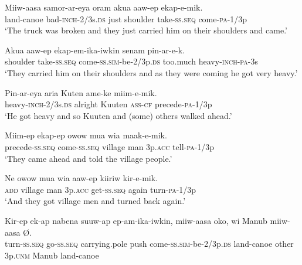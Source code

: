 \ea\label{ex:a:x41}
\gll  Miiw-aasa  samor-ar-eya  oram  akua  aaw-ep  ekap-e-mik. \\
land-canoe  bad-\textsc{inch}-2/3s.\textsc{ds}  just  shoulder  take-\textsc{ss.seq}  come-\textsc{pa}-1/3p \\
\glt ‘The truck was broken and they just carried him on their shoulders and came.’ \\
\z


\ea\label{ex:a:x42}
\gll  Akua  aaw-ep  ekap-em-ika-iwkin  senam             pin-ar-e-k. \\
shoulder  take-\textsc{ss.seq}  come-\textsc{ss}.\textsc{sim}-be-2/3p.\textsc{ds}  too.much  heavy-\textsc{inch}-\textsc{pa}-3s \\


\glt ‘They carried him on their shoulders and as they were coming he got very heavy.’ \\
\z


\ea\label{ex:a:x43}
\gll  Pin-ar-eya  aria  Kuten  ame-ke  miim-e-mik. \\
heavy-\textsc{inch}-2/3s.\textsc{ds}  alright  Kuuten  \textsc{ass}-\textsc{cf}  precede-\textsc{pa}-1/3p \\
\glt ‘He got heavy and so Kuuten and (some) others walked ahead.’ \\
\z


\ea\label{ex:a:x44}
\gll  Miim-ep  ekap-ep  owow  mua  wia  maak-e-mik. \\
precede-\textsc{ss.seq}  come-\textsc{ss.seq}  village  man  3p.\textsc{acc}  tell-\textsc{pa}-1/3p \\
\glt ‘They came ahead and told the village people.’ \\
\z


\ea\label{ex:a:x45}
\gll  Ne  owow  mua  wia  aaw-ep  kiiriw  kir-e-mik. \\
\textsc{add}  village  man  3p.\textsc{acc}  get-\textsc{ss.seq}  again  turn-\textsc{pa}-1/3p \\
\glt ‘And they got village men and turned back again.’ \\
\z


\ea\label{ex:a:x46}
\gll  Kir-ep  ek-ap  nabena  suuw-ap  ep-am-ika-iwkin,                miiw-aasa  oko,  wi  Manub  miiw-aasa  Ø. \\
turn-\textsc{ss.seq}  go-\textsc{ss.seq}  carrying.pole  push  come-\textsc{ss}.\textsc{sim}-be-2/3p.\textsc{ds}   land-canoe  other  3p.\textsc{unm}  Manub  land-canoe \\


